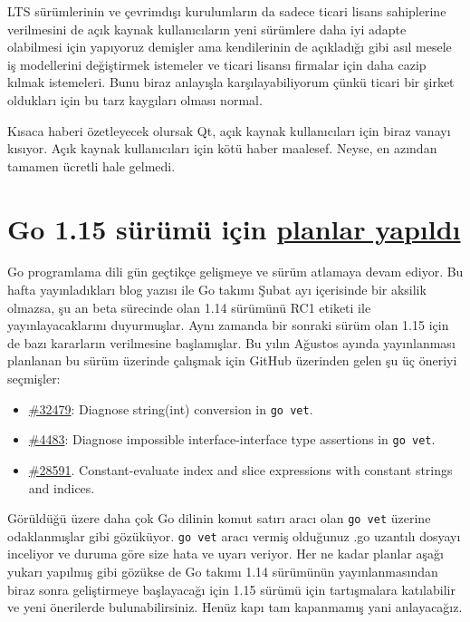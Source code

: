 \documentclass[11pt]{article}
\begin{document}
LTS sürümlerinin ve çevrimdışı kurulumların da sadece ticari lisans
sahiplerine verilmesini de açık kaynak kullanıcıların yeni sürümlere daha iyi
adapte olabilmesi için yapıyoruz demişler ama kendilerinin de açıkladığı gibi
asıl mesele iş modellerini değiştirmek istemeler ve ticari lisansı firmalar
için daha cazip kılmak istemeleri. Bunu biraz anlayışla karşılayabiliyorum
çünkü ticari bir şirket oldukları için bu tarz kaygıları olması normal.

Kısaca haberi özetleyecek olursak Qt, açık kaynak kullanıcıları için biraz
vanayı kısıyor. Açık kaynak kullanıcıları için kötü haber maalesef. Neyse, en
azından tamamen ücretli hale gelmedi.
\section{Go 1.15 sürümü için \href{https://blog.golang.org/go1.15-proposals}{planlar yapıldı}}
\label{sec:org6fc8bb1}
Go programlama dili gün geçtikçe gelişmeye ve sürüm atlamaya devam ediyor. Bu
hafta yayınladıkları blog yazısı ile Go takımı Şubat ayı içerisinde bir
aksilik olmazsa, şu an beta sürecinde olan 1.14 sürümünü RC1 etiketi ile
yayınlayacaklarını duyurmuşlar. Aynı zamanda bir sonraki sürüm olan 1.15 için de
bazı kararların verilmesine başlamışlar. Bu yılın Ağustos ayında yayınlanması
planlanan bu sürüm üzerinde çalışmak için GitHub üzerinden gelen şu üç öneriyi
seçmişler:

\begin{itemize}
\item \href{https://golang.org/issue/32479}{\#32479}: Diagnose string(int) conversion in \texttt{go vet}.
\item \href{https://golang.org/issue/4483}{\#4483}: Diagnose impossible interface-interface type assertions in \texttt{go vet}.
\item \href{https://golang.org/issue/28591}{\#28591}. Constant-evaluate index and slice expressions with constant strings
and indices.
\end{itemize}

Görüldüğü üzere daha çok Go dilinin komut satırı aracı olan \texttt{go vet} üzerine
odaklanmışlar gibi gözüküyor. \texttt{go vet} aracı vermiş olduğunuz .go uzantılı
dosyayı inceliyor ve duruma göre size hata ve uyarı veriyor. Her ne kadar
planlar aşağı yukarı yapılmış gibi gözükse de Go takımı 1.14 sürümünün
yayınlanmasından biraz sonra geliştirmeye başlayacağı için 1.15 sürümü için
tartışmalara katılabilir ve yeni önerilerde bulunabilirsiniz. Henüz kapı tam
kapanmamış yani anlayacağız.
\end{document}
